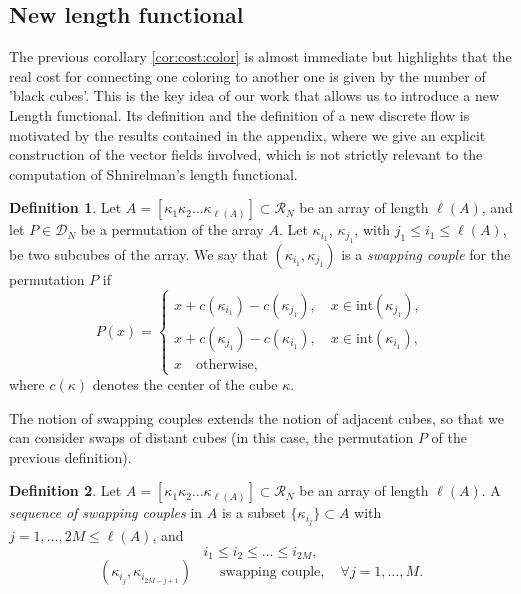 \documentclass[12 pt]{article}
\theoremstyle{definition} \newtheorem{definition}{Definition}[section]
\theoremstyle{definition} \newtheorem{remark}[definition]{Remark}
\theoremstyle{plain} \newtheorem{lemma}[definition]{Lemma}
\theoremstyle{plain} \newtheorem{proposition}[definition]{Proposition}
\theoremstyle{plain} \newtheorem{theorem}[definition]{Theorem}
\theoremstyle{plain} \newtheorem{corollary}[definition]{Corollary}
\theoremstyle{definition} \newtheorem{example}[definition]{Example}
\theoremstyle{definition} \newtheorem{assumption}[definition]{Assumption}
\theoremstyle{definition} \newtheorem{conjecture}[definition]{Conjecture}
\newcommand{\1}{\mathbbm 1}
\numberwithin{equation}{section}
\begin{document}
\subsection{New length functional}\label{SS:new:length}
The previous corollary \ref{cor:cost:color} is almost immediate but highlights that the real cost for connecting one coloring to another one is given by the number of 'black cubes'. This is the key idea of our work that allows us to introduce a new Length functional. Its definition and the definition of a new discrete flow is motivated by the results contained in the appendix, where we give an explicit construction of the vector fields involved, which is not strictly relevant to the computation of Shnirelman's length functional.
\begin{definition}\label{def:Exchanging:couple}
   Let $A=[\kappa_1 \kappa_2 \dots \kappa_{\ell(A)}]\subset\mathcal{R}_N$ be an array of length $\ell(A)$, and let $P\in\mathcal{D}_N$ be a permutation of the array $A$. Let $\kappa_{i_1}$, $\kappa_{j_1}$, with $j_1\leq i_1\leq \ell(A)$, be two subcubes of the array. We say that $(\kappa_{i_1},\kappa_{j_1})$ is a \emph{swapping couple}  for the permutation $P$ if
   \begin{equation*}
       P(x)=\begin{cases}
           x+c(\kappa_{i_1})-c(\kappa_{j_1}), \quad x\in \text{int}(\kappa_{j_1}), \\
           x+c(\kappa_{j_1})-c(\kappa_{i_1}), \quad x\in \text{int}(\kappa_{i_1}),\\
           x \quad\text{otherwise},
       \end{cases}
   \end{equation*}
   where $c(\kappa)$ denotes the center of the cube $\kappa$.
\end{definition}
The notion of swapping couples extends the notion of adjacent cubes, so that we can consider swaps of distant cubes (in this case, the permutation $P$ of the previous definition).
\begin{definition}\label{def:sequence:swapping:couple}
    Let $A=[\kappa_1 \kappa_2 \dots \kappa_{\ell(A)}]\subset\mathcal{R}_N$ be an array of length $\ell(A)$. A \emph{sequence of swapping couples} in $A$ is a subset $\lbrace \kappa_{i_j}\rbrace\subset A$ with $j=1,\dots,2M\leq\ell(A)$, and
    \begin{equation*}
    i_1\leq i_2\leq\dots  \leq i_{2M},
    \end{equation*}
    \begin{equation*}
(\kappa_{i_j},\kappa_{i_{2M-j+1}})\qquad\text{swapping couple},\quad\forall j=1,\dots,M.
    \end{equation*}
    
\end{definition}
\end{document}
